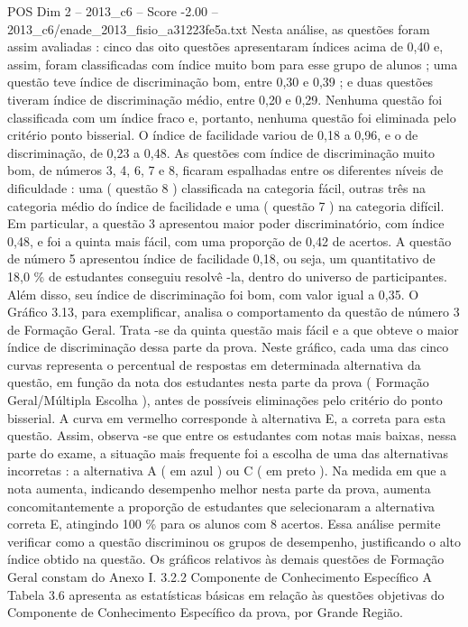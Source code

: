 \begin{textsample}{POS Dim 2 – 2013\_c6 – Score -2.00 – 2013\_c6/enade\_2013\_fisio\_a31223fe5a.txt}
Nesta análise, as questões foram assim avaliadas : cinco das oito questões apresentaram índices acima de 0,40 e, assim, foram classificadas com índice muito bom para esse grupo de alunos ; uma questão teve índice de discriminação bom, entre 0,30 e 0,39 ; e duas questões tiveram índice de discriminação médio, entre 0,20 e 0,29.
Nenhuma questão foi classificada com um índice fraco e, portanto, nenhuma questão foi eliminada pelo critério ponto bisserial.
O índice de facilidade variou de 0,18 a 0,96, e o de discriminação, de 0,23 a 0,48.
As questões com índice de discriminação muito bom, de números 3, 4, 6, 7 e 8, ficaram espalhadas entre os diferentes níveis de dificuldade : uma ( questão 8 ) classificada na categoria fácil, outras três na categoria médio do índice de facilidade e uma ( questão 7 ) na categoria difícil.
Em particular, a questão 3 apresentou maior poder discriminatório, com índice 0,48, e foi a quinta mais fácil, com uma proporção de 0,42 de acertos.
A questão de número 5 apresentou índice de facilidade 0,18, ou seja, um quantitativo de 18,0 \% de estudantes conseguiu resolvê -la, dentro do universo de participantes.
Além disso, seu índice de discriminação foi bom, com valor igual a 0,35.
O Gráfico 3.13, para exemplificar, analisa o comportamento da questão de número 3 de Formação Geral.
Trata -se da quinta questão mais fácil e a que obteve o maior índice de discriminação dessa parte da prova.
Neste gráfico, cada uma das cinco curvas representa o percentual de respostas em determinada alternativa da questão, em função da nota dos estudantes nesta parte da prova ( Formação Geral/Múltipla Escolha ), antes de possíveis eliminações pelo critério do ponto bisserial.
A curva em vermelho corresponde à alternativa E, a correta para esta questão.
Assim, observa -se que entre os estudantes com notas mais baixas, nessa parte do exame, a situação mais frequente foi a escolha de uma das alternativas incorretas : a alternativa A ( em azul ) ou C ( em preto ).
Na medida em que a nota aumenta, indicando desempenho melhor nesta parte da prova, aumenta concomitantemente a proporção de estudantes que selecionaram a alternativa correta E, atingindo 100 \% para os alunos com 8 acertos.
Essa análise permite verificar como a questão discriminou os grupos de desempenho, justificando o alto índice obtido na questão.
Os gráficos relativos às demais questões de Formação Geral constam do Anexo I. 3.2.2 Componente de Conhecimento Específico A Tabela 3.6 apresenta as estatísticas básicas em relação às questões objetivas do Componente de Conhecimento Específico da prova, por Grande Região.

\end{textsample}

